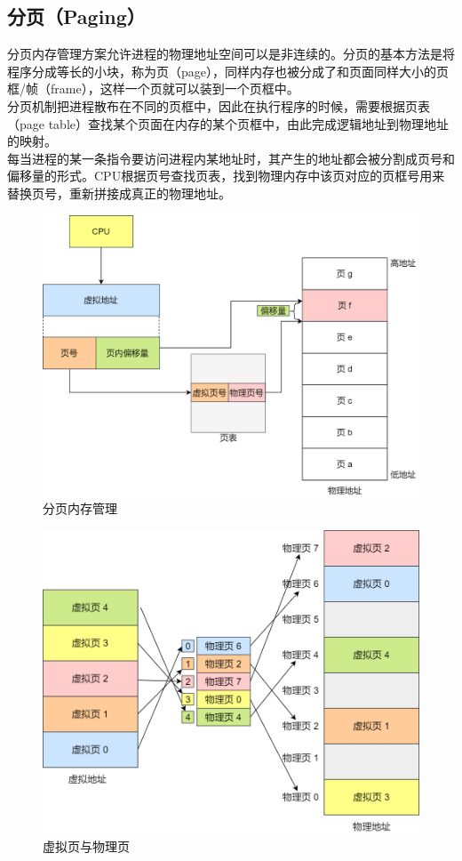 \subsection{分页（Paging）}

分页内存管理方案允许进程的物理地址空间可以是非连续的。分页的基本方法是将程序分成等长的小块，称为页（page），同样内存也被分成了和页面同样大小的页框/帧（frame），这样一个页就可以装到一个页框中。 \\

分页机制把进程散布在不同的页框中，因此在执行程序的时候，需要根据页表（page table）查找某个页面在内存的某个页框中，由此完成逻辑地址到物理地址的映射。 \\

每当进程的某一条指令要访问进程内某地址时，其产生的地址都会被分割成页号和偏移量的形式。CPU根据页号查找页表，找到物理内存中该页对应的页框号用来替换页号，重新拼接成真正的物理地址。

\begin{figure}[H]
	\centering
	\includegraphics[scale=0.35]{img/C3/3-5/1.png}
	\caption{分页内存管理}
\end{figure}

\begin{figure}[H]
	\centering
	\includegraphics[scale=0.4]{img/C3/3-5/2.png}
	\caption{虚拟页与物理页}
\end{figure}

